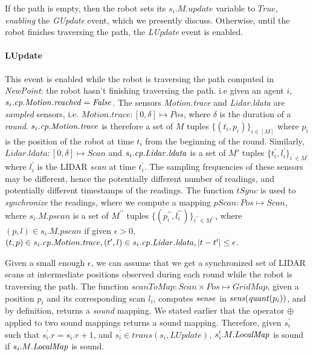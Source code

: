 If the path is empty, then the robot sets its $s_i.M.\mathit{update}$ variable to $True$, \emph{enabling} the \emph{GUpdate} event, which we presently discuss. Otherwise, until the robot finishes traversing the path, the \emph{LUpdate} event is enabled.

\paragraph{LUpdate}
This event is enabled while the robot is traversing the path computed in \emph{NewPoint}: the robot hasn't finishing traversing the path. i.e given an agent $i$, $s_i.\mathit{cp}.\mathit{Motion.reached}  = \mathit{False}$. The sensors \emph{Motion.trace} and \emph{Lidar.ldata} are \emph{sampled} sensors, i.e. $\mathit{Motion.trace}: [0,\delta] \mapsto \mathit{Pos}$, where $\delta$ is the duration of a \emph{round}. $s_i.\mathit{cp}.\mathit{Motion.trace}$ is therefore a set of $M$ tuples $\{(t_i, p_i)\}_{i \in [M]}$ where $p_i$ is the position of the robot at time $t_i$ from the beginning of the round. Similarly, $\mathit{Lidar.ldata} : [0,\delta]\mapsto \mathit{Scan}$ and $s_i.\mathit{cp}.\mathit{Lidar.ldata}$ is a set of $M'$ tuples $\{t_i^\prime, l_i^\prime\}_{i^\prime \in M^\prime}$ where $l_i^\prime$ is the LIDAR \emph{scan} at time $t_i^\prime$. The sampling frequencies of these sensors may be different, hence the potentially different number of readings, and potentially different timestamps of the readings. The function $\mathit{tSync}$ is used to \emph{synchronize} the readings, where we compute a mapping $\mathit{pScan}: \mathit{Pos} \mapsto \mathit{Scan}$, where $s_i.M.\mathit{pscan}$ is a set of $M^{\prime\prime}$ tuples $\{(p_i^{\prime\prime}, l_i^{\prime\prime})\}_{i^{\prime\prime} \in M ^{\prime\prime}}$, where  $(p, l) \in s_i.M.\mathit{pscan}$ if given $\epsilon > 0$,  $(t,p) \in s_i.\mathit{cp}.\mathit{Motion.trace}, (t^\prime,l )\in s_i.\mathit{cp}.\mathit{Lidar.ldata}, |t - t^\prime| \leq \epsilon$.

Given a small enough $\epsilon$, we can assume that we get a synchronized set of LIDAR scans at intermediate positions observed during each round while the robot is traversing the path.  The function $\mathit{scanToMap}: \mathit{Scan} \times \mathit{Pos}\mapsto \mathit{GridMap}$, given a position $p_i$ and its corresponding scan $l_i$, computes $\mathit{sense}$ in $\mathit{sens}(\mathit{quant}(p_i))$, and by definition, returns a \emph{sound} mapping. We stated earlier that the operator $\oplus$ applied to two sound mappings returns a sound mapping. Therefore, given $s_i^\prime$ such that $s_i^\prime.r = s_i.r + 1$, and $\mathit{s_i^\prime \in \mathit{trans}(s_i,\mathit{LUpdate})}$,  $s_i^\prime.M.\mathit{LocalMap}$ is sound if $s_i.M.\mathit{LocalMap}$ is sound.

